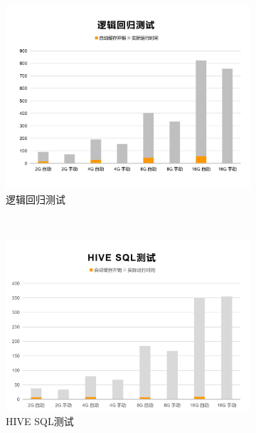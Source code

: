 \begin{figure}[!htbp]
    \centering
    \begin{subfigure}[b]{0.45\linewidth}
      \includegraphics[width=\textwidth]{Img/LR-cache.png}
      \caption{逻辑回归测试}
      \label{fig:lr-auto-cache}
    \end{subfigure}%
    ~%
    \begin{subfigure}[b]{0.45\linewidth}
      \includegraphics[width=\textwidth]{Img/HIVE-cache.png}
      \caption{HIVE SQL测试}
      \label{fig:hive-auto-cache}
    \end{subfigure}
    \\%
    \begin{subfigure}[b]{0.45\linewidth}

\end{subfigure}
\end{figure}
